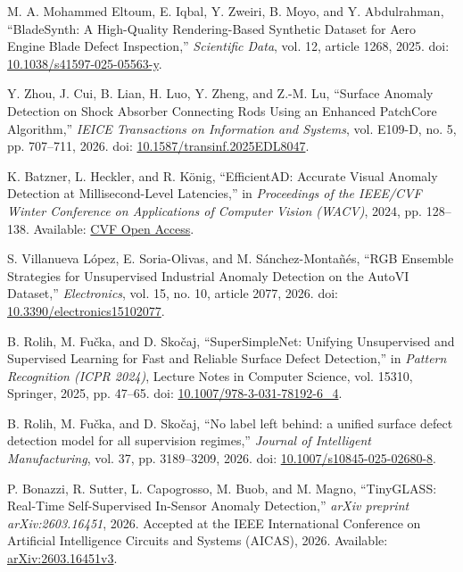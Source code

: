M. A. Mohammed Eltoum, E. Iqbal, Y. Zweiri,
B. Moyo, and Y. Abdulrahman,
``BladeSynth: A High-Quality Rendering-Based Synthetic
Dataset for Aero Engine Blade Defect Inspection,''
\textit{Scientific Data}, vol. 12, article 1268, 2025.
doi:
\href{https://doi.org/10.1038/s41597-025-05563-y}
{10.1038/s41597-025-05563-y}.

Y. Zhou, J. Cui, B. Lian, H. Luo, Y. Zheng,
and Z.-M. Lu,
``Surface Anomaly Detection on Shock Absorber Connecting
Rods Using an Enhanced PatchCore Algorithm,''
\textit{IEICE Transactions on Information and Systems},
vol. E109-D, no. 5, pp. 707--711, 2026.
doi:
\href{https://doi.org/10.1587/transinf.2025EDL8047}
{10.1587/transinf.2025EDL8047}.

K. Batzner, L. Heckler, and R. K\"onig,
``EfficientAD: Accurate Visual Anomaly Detection at
Millisecond-Level Latencies,''
in \textit{Proceedings of the IEEE/CVF Winter Conference
    on Applications of Computer Vision (WACV)},
2024, pp. 128--138.
Available:
\href{https://openaccess.thecvf.com/content/WACV2024/html/Batzner_EfficientAD_Accurate_Visual_Anomaly_Detection_at_Millisecond-Level_Latencies_WACV_2024_paper.html}
{CVF Open Access}.

S. Villanueva L\'opez, E. Soria-Olivas,
and M. S\'anchez-Monta\~n\'es,
``RGB Ensemble Strategies for Unsupervised Industrial
Anomaly Detection on the AutoVI Dataset,''
\textit{Electronics}, vol. 15, no. 10,
article 2077, 2026.
doi:
\href{https://doi.org/10.3390/electronics15102077}
{10.3390/electronics15102077}.

B. Rolih, M. Fu\v{c}ka, and D. Sko\v{c}aj,
``SuperSimpleNet: Unifying Unsupervised and Supervised
Learning for Fast and Reliable Surface Defect Detection,''
in \textit{Pattern Recognition (ICPR 2024)},
Lecture Notes in Computer Science, vol. 15310,
Springer, 2025, pp. 47--65.
doi:
\href{https://doi.org/10.1007/978-3-031-78192-6_4}
{10.1007/978-3-031-78192-6\_4}.

B. Rolih, M. Fu\v{c}ka, and D. Sko\v{c}aj,
``No label left behind: a unified surface defect detection
model for all supervision regimes,''
\textit{Journal of Intelligent Manufacturing},
vol. 37, pp. 3189--3209, 2026.
doi:
\href{https://doi.org/10.1007/s10845-025-02680-8}
{10.1007/s10845-025-02680-8}.

P. Bonazzi, R. Sutter, L. Capogrosso,
M. Buob, and M. Magno,
``TinyGLASS: Real-Time Self-Supervised In-Sensor
Anomaly Detection,''
\textit{arXiv preprint arXiv:2603.16451}, 2026.
Accepted at the IEEE International Conference on
Artificial Intelligence Circuits and Systems (AICAS), 2026.
Available:
\href{https://arxiv.org/abs/2603.16451v3}
{arXiv:2603.16451v3}.

